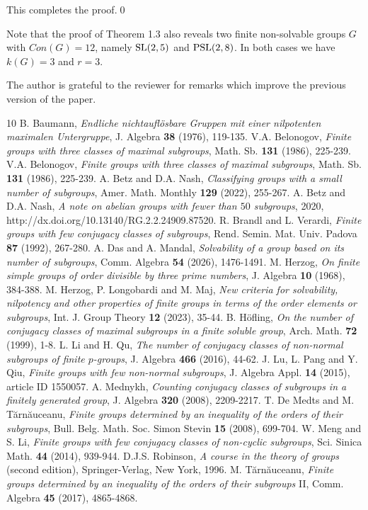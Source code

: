\documentclass[12pt]{article}
\newcommand{\0}{{\leqno}}
\begin{document}
This completes the proof.\qed
\bigskip

Note that the proof of Theorem 1.3 also reveals two finite non-solvable groups $G$ with $Con(G)=12$, namely ${\rm SL}(2,5)$ and ${\rm PSL}(2,8)$. In both cases we have $k(G)=3$ and $r=3$.

\bigskip{} The author is grateful to the reviewer for remarks which improve the previous version of the paper.

\begin{thebibliography}{10}
 B. Baumann, {\it Endliche nichtaufl\"osbare Gruppen mit einer nilpotenten maximalen Untergruppe}, J. Algebra {\bf 38} (1976), 119-135.
 V.A. Belonogov, {\it Finite groups with three classes of maximal subgroups}, Math. Sb. {\bf 131} (1986), 225-239.
 V.A. Belonogov, {\it Finite groups with three classes of maximal subgroups}, Math. Sb. {\bf 131} (1986), 225-239.
 A. Betz and D.A. Nash, {\it Classifying groups with a small number of subgroups}, Amer. Math. Monthly {\bf 129} (2022), 255-267.
 A. Betz and D.A. Nash, {\it A note on abelian groups with fewer than $50$ subgroups}, 2020, http://dx.doi.org/10.13140/RG.2.2.24909.87520.
 R. Brandl and L. Verardi, {\it Finite groups with few conjugacy classes of subgroups}, Rend. Semin. Mat. Univ. Padova {\bf 87} (1992), 267-280.
 A. Das and A. Mandal, {\it Solvability of a group based on its number of subgroups}, Comm. Algebra {\bf 54} (2026), 1476-1491.
 M. Herzog, {\it On finite simple groups of order divisible by three prime numbers}, J. Algebra {\bf 10} (1968), 384-388.
 M. Herzog, P. Longobardi and M. Maj, {\it New criteria for solvability, nilpotency and other properties of finite groups in terms of the order elements or subgroups}, Int. J. Group Theory {\bf 12} (2023), 35-44.
 B. H\"{o}fling, {\it On the number of conjugacy classes of maximal subgroups in a finite soluble group}, Arch. Math. {\bf 72} (1999), 1-8.
 L. Li and H. Qu, {\it The number of conjugacy classes of non-normal subgroups of finite $p$-groups}, J. Algebra {\bf 466} (2016), 44-62.
 J. Lu, L. Pang and Y. Qiu, {\it Finite groups with few non-normal subgroups}, J. Algebra Appl. {\bf 14} (2015), article ID 1550057.
 A. Mednykh, {\it Counting conjugacy classes of subgroups in a finitely generated group}, J. Algebra {\bf 320} (2008), 2209-2217.
 T. De Medts and M. T\u arn\u auceanu, {\it Finite groups determined by an ine\-quality of the orders of their subgroups}, Bull. Belg. Math. Soc. Simon Stevin {\bf 15} (2008), 699-704.
 W. Meng and S. Li, {\it Finite groups with few conjugacy classes of non-cyclic subgroups}, Sci. Sinica Math. {\bf 44} (2014), 939-944.
 D.J.S. Robinson, {\it A course in the theory of groups} (second edition), Springer-Verlag, New York, 1996.
 M. T\u arn\u auceanu, {\it Finite groups determined by an inequality of the orders of their subgroups} II, Comm. Algebra {\bf 45} (2017), 4865-4868.
\end{thebibliography}
\vspace*{5ex}\small
\end{document}
